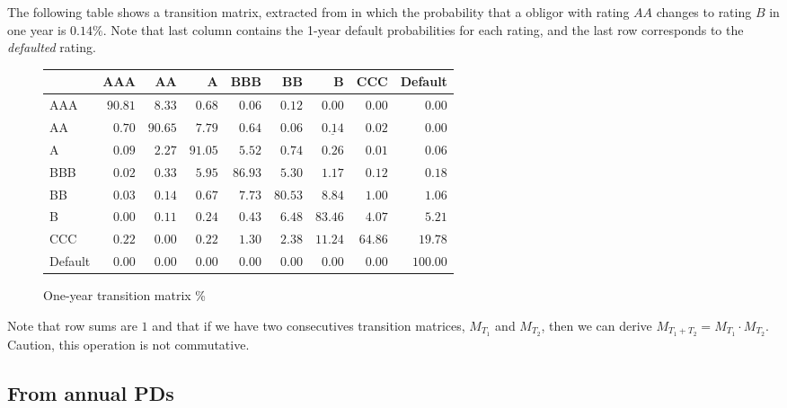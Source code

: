 \documentclass[11pt,fleqn]{book} %
\begin{document}
\begin{example}
	\label{ex:1ytm}
	The following table shows a transition matrix, extracted from 
	\cite[p. 20]{cmetrics:1997} in which the probability that a obligor with 
	rating $AA$ changes to rating $B$ in one year is $0.14\%$. Note that last 
	column contains the 1-year default probabilities for each rating, and the 
	last row corresponds to the \emph{defaulted} rating.

	\begin{figure}[!hb]
		\begin{center}
			\begin{tabular}[]{l|rrrrrrrr}
				        & AAA     & AA      & A       & BBB     & BB      & B                  & CCC     & Default  \\
				\hline
				AAA     & $90.81$ & $8.33$  & $0.68$  & $0.06$  & $0.12$  & $0.00$             & $0.00$  & $0.00$   \\
				AA      & $0.70$  & $90.65$ & $7.79$  & $0.64$  & $0.06$  & $\underline{0.14}$ & $0.02$  & $0.00$   \\
				A       & $0.09$  & $2.27$  & $91.05$ & $5.52$  & $0.74$  & $0.26$             & $0.01$  & $0.06$   \\
				BBB     & $0.02$  & $0.33$  & $5.95$  & $86.93$ & $5.30$  & $1.17$             & $0.12$  & $0.18$   \\
				BB      & $0.03$  & $0.14$  & $0.67$  & $7.73$  & $80.53$ & $8.84$             & $1.00$  & $1.06$   \\
				B       & $0.00$  & $0.11$  & $0.24$  & $0.43$  & $6.48$  & $83.46$            & $4.07$  & $5.21$   \\
				CCC     & $0.22$  & $0.00$  & $0.22$  & $1.30$  & $2.38$  & $11.24$            & $64.86$ & $19.78$  \\
				Default & $0.00$  & $0.00$  & $0.00$  & $0.00$  & $0.00$  & $0.00$             & $0.00$  & $100.00$ \\
			\end{tabular}
			\caption{One-year transition matrix \%}
			\label{tmatrix1}
		\end{center}
	\end{figure}
\end{example}

Note that row sums are $1$ and that if we have two consecutives transition 
matrices, $M_{T_1}$ and $M_{T_2}$, then we can derive 
$M_{T_1+T_2} = M_{T_1} \cdot M_{T_2}$. 
Caution, this operation is not commutative.

\subsection{From annual PDs}
\end{document}
